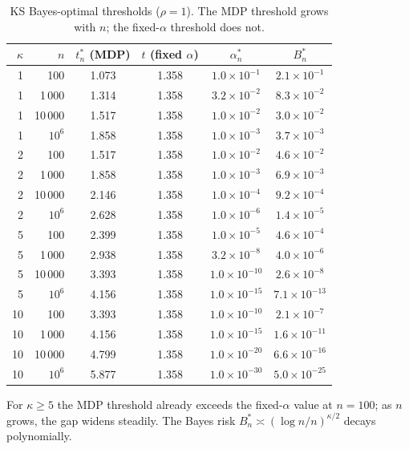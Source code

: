 \documentclass[11pt]{article}
\newcommand{\rhotail}{\rho}  %
\newcommand{\1}{\mathbf{1}}
\theoremstyle{plain}
\theoremstyle{definition}
\theoremstyle{remark}
\begin{document}
\begin{table}[!ht]
\centering
\caption{KS Bayes-optimal thresholds ($\rhotail=1$). The MDP threshold grows with $n$; the fixed-$\alpha$ threshold does not.}\label{tab:ks}
\smallskip
\begin{tabular}{rrcccc}
\toprule
$\kappa$ & $n$ & $t_n^{*}$ (MDP) & $t$ (fixed $\alpha$) & $\alpha_n^{*}$ & $B_n^{*}$ \\
\midrule
1 & 100       & 1.073 & 1.358 & $1.0\times 10^{-1}$ & $2.1\times 10^{-1}$ \\
1 & 1\,000    & 1.314 & 1.358 & $3.2\times 10^{-2}$ & $8.3\times 10^{-2}$ \\
1 & 10\,000   & 1.517 & 1.358 & $1.0\times 10^{-2}$ & $3.0\times 10^{-2}$ \\
1 & $10^6$    & 1.858 & 1.358 & $1.0\times 10^{-3}$ & $3.7\times 10^{-3}$ \\
\midrule
2 & 100       & 1.517 & 1.358 & $1.0\times 10^{-2}$ & $4.6\times 10^{-2}$ \\
2 & 1\,000    & 1.858 & 1.358 & $1.0\times 10^{-3}$ & $6.9\times 10^{-3}$ \\
2 & 10\,000   & 2.146 & 1.358 & $1.0\times 10^{-4}$ & $9.2\times 10^{-4}$ \\
2 & $10^6$    & 2.628 & 1.358 & $1.0\times 10^{-6}$ & $1.4\times 10^{-5}$ \\
\midrule
5 & 100       & 2.399 & 1.358 & $1.0\times 10^{-5}$ & $4.6\times 10^{-4}$ \\
5 & 1\,000    & 2.938 & 1.358 & $3.2\times 10^{-8}$ & $4.0\times 10^{-6}$ \\
5 & 10\,000   & 3.393 & 1.358 & $1.0\times 10^{-10}$ & $2.6\times 10^{-8}$ \\
5 & $10^6$    & 4.156 & 1.358 & $1.0\times 10^{-15}$ & $7.1\times 10^{-13}$ \\
\midrule
10 & 100      & 3.393 & 1.358 & $1.0\times 10^{-10}$ & $2.1\times 10^{-7}$ \\
10 & 1\,000   & 4.156 & 1.358 & $1.0\times 10^{-15}$ & $1.6\times 10^{-11}$ \\
10 & 10\,000  & 4.799 & 1.358 & $1.0\times 10^{-20}$ & $6.6\times 10^{-16}$ \\
10 & $10^6$   & 5.877 & 1.358 & $1.0\times 10^{-30}$ & $5.0\times 10^{-25}$ \\
\bottomrule
\end{tabular}
\end{table}

For $\kappa\ge 5$ the MDP threshold already exceeds the fixed-$\alpha$ value at $n=100$; as $n$ grows, the gap widens steadily. The Bayes risk $B_n^{*}\asymp(\log n/n)^{\kappa/2}$ decays polynomially.
\end{document}
